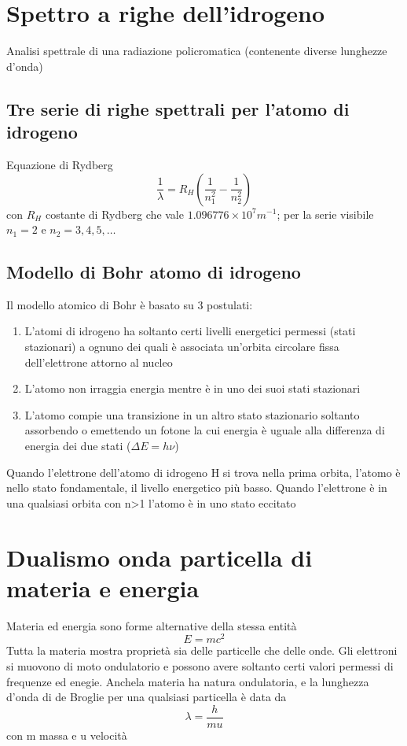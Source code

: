 \documentclass[a4paper,11pt]{report}
\begin{document}
\section{Spettro a righe dell'idrogeno}
Analisi spettrale di una radiazione policromatica (contenente diverse lunghezze d'onda)

\subsection*{Tre serie di righe spettrali per l'atomo di idrogeno}

Equazione di Rydberg
\begin{equation*}
	\frac{1}{\lambda} = R_H \left(\frac{1}{n^2_1}-\frac{1}{n^2_2}\right)
\end{equation*}
con $R_H$ costante di Rydberg che vale $1.096776 \times 10^7 m^{-1}$; per la serie visibile $n_1=2$ e $n_2 = 3,4,5,\dots$ 

\subsection*{Modello di Bohr atomo di idrogeno}

Il modello atomico di Bohr è basato su 3 postulati:
\begin{enumerate}
	\item L'atomi di idrogeno ha soltanto certi livelli energetici permessi (stati stazionari) a ognuno dei quali è associata un'orbita circolare fissa dell'elettrone attorno al nucleo
	\item L'atomo non irraggia energia mentre è in uno dei suoi stati stazionari
	\item L'atomo compie una transizione in un altro stato stazionario soltanto assorbendo o emettendo un fotone la cui energia è uguale alla differenza di energia dei due stati ($\Delta E = h\nu$)
\end{enumerate}
Quando l'elettrone dell'atomo di idrogeno H si trova nella prima orbita, l'atomo è nello stato fondamentale, il livello energetico più basso. 
Quando l'elettrone è in una qualsiasi orbita con n>1 l'atomo è in uno stato eccitato

\section{Dualismo onda particella di materia e energia}

Materia ed energia sono forme alternative della stessa entità
\begin{equation*}
	E = mc^2
\end{equation*}
Tutta la materia mostra proprietà sia delle particelle che delle onde. Gli elettroni si muovono di moto ondulatorio e possono avere soltanto certi valori permessi di frequenze ed enegie. 
Anchela materia ha natura ondulatoria, e la lunghezza d'onda di de Broglie per una qualsiasi particella è data da 
\begin{equation*}
	\lambda = \frac{h}{mu}
\end{equation*}
con m massa e u velocità
\end{document}
